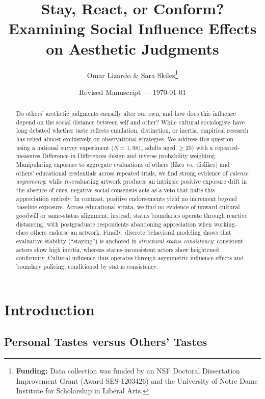 \documentclass[12pt, letterpaper]{article}
\title{Stay, React, or Conform? Examining Social Influence Effects on Aesthetic Judgments}
\author{Omar Lizardo \& Sara Skiles\thanks{\textbf{Funding:} Data collection was funded by an NSF Doctoral Dissertation Improvement Grant (Award SES-1203426) and the University of Notre Dame Institute for Scholarship in Liberal Arts.}}
\date{Revised Manuscript --- \today}
\begin{document}
\maketitle

\begin{abstract}
Do others' aesthetic judgments causally alter our own, and how does this influence depend on the social distance between self and other? While cultural sociologists have long debated whether taste reflects emulation, distinction, or inertia, empirical research has relied almost exclusively on observational strategies. We address this question using a national survey experiment ($N = 1,981$, adults aged $\ge 25$) with a repeated-measures Difference-in-Differences design and inverse probability weighting. Manipulating exposure to aggregate evaluations of others (likes vs.\ dislikes) and others' educational credentials across repeated trials, we find strong evidence of \textit{valence asymmetry}: while re-evaluating artwork produces an intrinsic positive exposure drift in the absence of cues, negative social consensus acts as a veto that halts this appreciation entirely. In contrast, positive endorsements yield no increment beyond baseline exposure. Across educational strata, we find no evidence of upward cultural goodwill or same-status alignment; instead, status boundaries operate through reactive distancing, with postgraduate respondents abandoning appreciation when working-class others endorse an artwork. Finally, discrete behavioral modeling shows that evaluative stability (``staying'') is anchored in \textit{structural status consistency}: consistent actors show high inertia, whereas status-inconsistent actors show heightened conformity. Cultural influence thus operates through asymmetric influence effects and boundary policing, conditioned by status consistency.
\end{abstract}

\newpage
\section{Introduction}

\subsection{Personal Tastes versus Others' Tastes}
\end{document}
